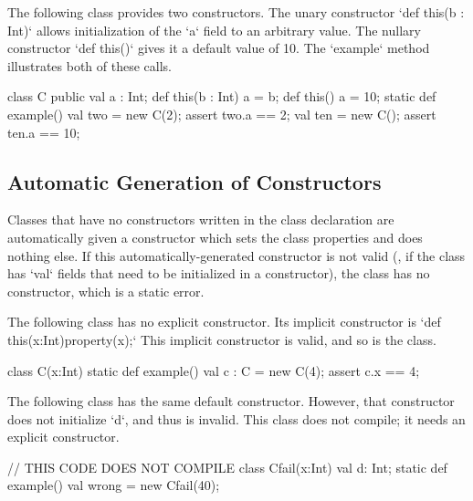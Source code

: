 \begin{ex}

The following class provides two constructors.  The unary constructor 
\xcd`def this(b : Int)` allows initialization of the \xcd`a` field to an 
arbitrary value.  The nullary constructor \xcd`def this()` gives it a default
value of 10.  The \xcd`example` method illustrates both of these calls.


\begin{xten}
class C {
  public val a : Int;
  def this(b : Int) { a = b; } 
  def this()        { a = 10; }
  static def example() {
     val two = new C(2);
     assert two.a == 2;
     val ten = new C(); 
     assert ten.a == 10;
  }
}
\end{xten}
\end{ex}

\subsection{Automatic Generation of Constructors}

Classes that have no constructors written in the class declaration are
automatically given a constructor which sets the class properties and does
nothing else. If this automatically-generated constructor is not valid (\eg,
if the class has \xcd`val` fields that need to be initialized in a
constructor), the class has no constructor, which is a static error.

\begin{ex}
The following class has no explicit constructor.
Its implicit constructor is 
\xcd`def this(x:Int){property(x);}`
This implicit constructor is valid, and so is the class. 
\begin{xten}
class C(x:Int) {
  static def example() {
    val c : C = new C(4);
    assert c.x == 4;
  }
}
\end{xten}
\noindent 


The following class has the same default constructor.  However, that
constructor does not initialize \xcd`d`, and thus is invalid.  This 
class does not compile; it needs an explicit constructor.
\begin{xten}
// THIS CODE DOES NOT COMPILE
class Cfail(x:Int) {
  val d: Int;
  static def example() {
    val wrong = new Cfail(40);
  }
}
\end{xten}
%


\end{ex}

